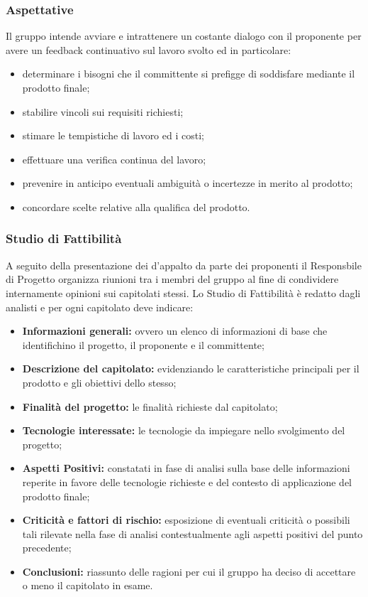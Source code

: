 \subsubsection{Aspettative}
Il gruppo intende avviare e intrattenere un costante dialogo con il proponente per avere un feedback continuativo sul lavoro svolto ed in particolare:
\begin{itemize}
  \item determinare i bisogni che il committente si prefigge di soddisfare mediante il prodotto finale;
  \item stabilire vincoli sui requisiti richiesti;
  \item stimare le tempistiche di lavoro ed i costi;
  \item effettuare una verifica continua del lavoro;
  \item prevenire in anticipo eventuali ambiguità o incertezze in merito al prodotto;
  \item concordare scelte relative alla qualifica del prodotto.
\end{itemize}

\subsubsection{Studio di Fattibilità}
\label{_studioDiFattibilita}
A seguito della presentazione dei  d'appalto da parte dei proponenti il Responsbile di Progetto organizza riunioni tra i membri del gruppo al fine di condividere internamente opinioni sui capitolati stessi.
Lo Studio di Fattibilità è redatto dagli analisti e per ogni capitolato deve indicare:
\begin{itemize}
  \item \textbf{Informazioni generali:} ovvero un elenco di informazioni di base che identifichino il progetto, il proponente e il committente;
  \item \textbf{Descrizione del capitolato:}  evidenziando le caratteristiche principali per il prodotto e gli obiettivi dello stesso;
  \item \textbf{Finalità del progetto:} le finalità richieste dal capitolato;
  \item \textbf{Tecnologie interessate:} le tecnologie da impiegare nello svolgimento del progetto;
  \item \textbf{Aspetti Positivi:} constatati in fase di analisi sulla base delle informazioni reperite in favore delle tecnologie richieste e del contesto di applicazione del prodotto finale;
  \item \textbf{Criticità e fattori di rischio:} esposizione di eventuali criticità o possibili tali rilevate nella fase di analisi contestualmente agli aspetti positivi del punto precedente;
  \item \textbf{Conclusioni:} riassunto delle ragioni per cui il gruppo ha deciso di accettare o meno il capitolato in esame.
\end{itemize}

